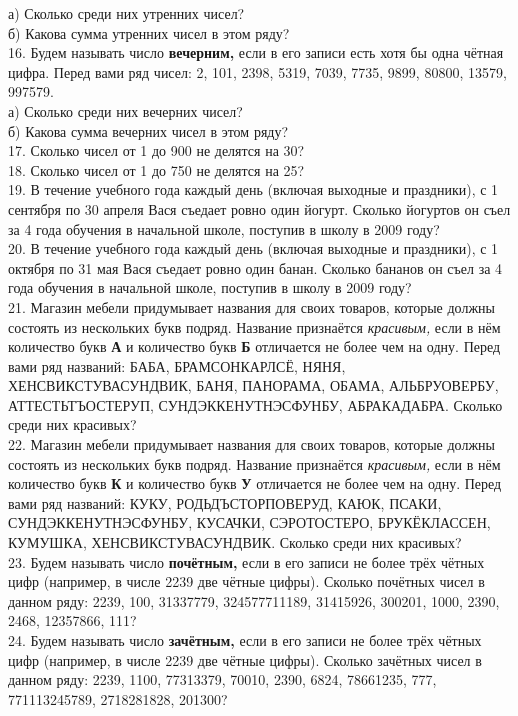 \documentclass[12pt]{article}
\begin{document}
а) Сколько среди них утренних чисел?\\
б) Какова сумма утренних чисел в этом ряду?\\
16. Будем называть число {\bf вечерним,} если в его записи есть хотя бы одна чётная цифра. Перед вами ряд чисел: 2, 101, 2398, 5319, 7039, 7735, 9899, 80800, 13579, 997579.\\
а) Сколько среди них вечерних чисел?\\
б) Какова сумма вечерних чисел в этом ряду?\\
17. Сколько чисел от 1 до 900 не делятся на 30?\\
18. Сколько чисел от 1 до 750 не делятся на 25?\\
19. В течение учебного года каждый день (включая выходные и праздники), с 1 сентября по 30 апреля Вася съедает ровно один йогурт. Сколько йогуртов он съел за 4 года обучения в начальной школе, поступив в школу в 2009 году?\\
20. В течение учебного года каждый день (включая выходные и праздники), с 1 октября по 31 мая Вася съедает ровно один банан. Сколько бананов он съел за 4 года обучения в начальной школе, поступив в школу в 2009 году?\\
21. Магазин мебели придумывает названия для своих товаров, которые должны состоять из нескольких букв подряд. Название признаётся {\it красивым,} если в нём количество букв {\bf А} и количество букв {\bf Б} отличается не более чем на одну. Перед вами ряд названий: БАБА, БРАМСОНКАРЛСЁ, НЯНЯ, ХЕНСВИКСТУВАСУНДВИК, БАНЯ, ПАНОРАМА, ОБАМА, АЛЬБРУОВЕРБУ, АТТЕСТЬТЪОСТЕРУП, СУНДЭККЕНУТНЭСФУНБУ, АБРАКАДАБРА. Сколько среди них красивых?\\
22. Магазин мебели придумывает названия для своих товаров, которые должны состоять из нескольких букв подряд. Название признаётся {\it красивым,} если в нём количество букв {\bf К} и количество букв {\bf У} отличается не более чем на одну. Перед вами ряд названий: КУКУ, РОДЬДЪСТОРПОВЕРУД, КАЮК, ПСАКИ, СУНДЭККЕНУТНЭСФУНБУ, КУСАЧКИ, СЭРОТОСТЕРО, БРУКЁКЛАССЕН, КУМУШКА, ХЕНСВИКСТУВАСУНДВИК. Сколько среди них красивых?\\
23. Будем называть число {\bf почётным,} если в его записи не более трёх чётных цифр (например, в числе 2239 две чётные цифры). Сколько почётных чисел в данном ряду: 2239, 100, 31337779, 324577711189, 31415926, 300201, 1000, 2390, 2468, 12357866, 111?\\
24. Будем называть число {\bf зачётным,} если в его записи не более трёх чётных цифр (например, в числе 2239 две чётные цифры). Сколько зачётных чисел в данном ряду: 2239, 1100, 77313379, 70010, 2390, 6824, 78661235, 777, 771113245789, 2718281828, 201300?\\
\end{document}
